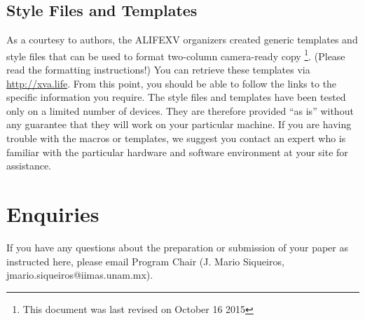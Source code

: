 \documentclass[letterpaper]{article}
\begin{document}
\subsection{Style Files and Templates}
As a courtesy to authors, the ALIFEXV organizers created generic templates 
and style files that can be used to format two-column camera-ready copy
\footnote{This document was last revised on October 16 2015}. 
(Please read the formatting instructions!) You can retrieve these templates 
via \href{url}{http://xva.life}.
From this point, you should be able to follow the 
links to the specific information you require. 
The style files and templates have been tested only on a limited number 
of devices. They are therefore provided ``as is'' without any guarantee 
that they will work on your particular machine. If you are having trouble 
with the macros or templates, we suggest you contact an expert who is 
familiar with the particular hardware and software environment at your 
site for assistance. 

\section{Enquiries}
If you have any questions about the preparation or submission of your paper as instructed here, please email Program Chair (J. Mario Siqueiros, jmario.siqueiros@iimas.unam.mx).	
\end{document}
